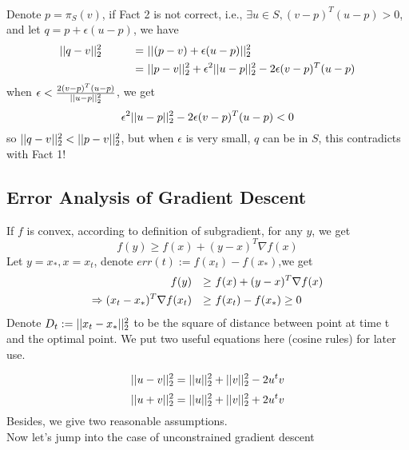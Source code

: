 \documentclass[11pt]{article}
\begin{document}
\\
 Denote $p = \pi_S(v)$, if Fact 2 is not correct, i.e., $\exists u \in S, (v-p)^T(u-p) > 0$, and let $q = p + \epsilon(u-p)$, we have \\
\begin{alignat}{2}
||q-v||_2^2 \qquad && = &~ ||(p-v) + \epsilon(u-p)||_2^2 \notag \\
               && = &~ ||p-v||_2^2 + \epsilon^2||u-p||_2^2 - 2\epsilon(v-p)^T(u-p) \notag 
\end{alignat}
when $\epsilon < \frac{2(v-p)^T(u-p)}{||u-p||_2^2}$, we get
\begin{equation}
    \epsilon^2||u-p||_2^2 - 2\epsilon(v-p)^T(u-p)  < 0
\end{equation}
so $||q-v||_2^2 < ||p-v||_2^2$, but when $\epsilon$ is very small, $q$ can be in $S$, this contradicts with Fact 1!

\subsection{Error Analysis of Gradient Descent}
If $f$ is convex, according to definition of subgradient, for any $y$, we get 
\begin{equation}
    f(y) \geq f(x) + (y-x)^T \nabla f(x)
\end{equation}
Let $y = x_*, x = x_t$, denote $err(t) := f(x_t) - f(x_*)$,we get
\begin{alignat}{2}
    f(y) && \geq &~ f(x) + (y-x)^T \nabla f(x) \notag \\
    \Rightarrow (x_t-x_*)^T\nabla f(x_t) && \geq &~ f(x_t) - f(x_*) \geq 0 
\label{equ:acute}
\end{alignat}
Denote $D_t := ||x_t - x_*||_2^2$ to be the square of distance between point at time t and the optimal point. We put two useful equations here (cosine rules) for later use.

\begin{equation}
    ||u-v||_2^2 = ||u||_2^2 + ||v||_2^2 - 2u^t v
\label{equ:square_diff}
\end{equation}
\begin{equation}
    ||u+v||_2^2 = ||u||_2^2 + ||v||_2^2 + 2u^t v
\label{equ:square_sum}
\end{equation}
Besides, we give two reasonable assumptions.
\\
Now let's jump into the case of unconstrained gradient descent
\end{document}
